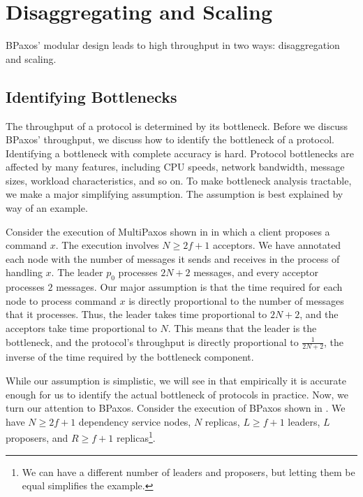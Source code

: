 \section{Disaggregating and Scaling}
BPaxos' modular design leads to high throughput in two ways: disaggregation and
scaling.

\subsection{Identifying Bottlenecks}
The throughput of a protocol is determined by its bottleneck. Before we discuss
BPaxos' throughput, we discuss how to identify the bottleneck of a protocol.
Identifying a bottleneck with complete accuracy is hard. Protocol bottlenecks
are affected by many features, including CPU speeds, network bandwidth, message
sizes, workload characteristics, and so on. To make bottleneck analysis
tractable, we make a major simplifying assumption. The assumption is best
explained by way of an example.

{}

Consider the execution of MultiPaxos shown in  in
which a client proposes a command $x$. The execution involves $N \geq 2f+1$
acceptors. We have annotated each node with the number of messages it sends and
receives in the process of handling $x$. The leader $p_0$ processes $2N+2$
messages, and every acceptor processes $2$ messages. Our major assumption is
that the time required for each node to process command $x$ is directly
proportional to the number of messages that it processes. Thus, the leader
takes time proportional to $2N+2$, and the acceptors take time proportional to
$N$. This means that the leader is the bottleneck, and the protocol's
throughput is directly proportional to $\frac{1}{2N+2}$, the inverse of the
time required by the bottleneck component.

While our assumption is simplistic, we will see in  that
empirically it is accurate enough for us to identify the actual bottleneck of
protocols in practice. Now, we turn our attention to BPaxos. Consider the
execution of BPaxos shown in . We have $N \geq 2f+1$
dependency service nodes, $N$ replicas, $L \geq f+1$ leaders, $L$ proposers,
and $R \geq f+1$ replicas\footnote{We can have a different number of leaders
and proposers, but letting them be equal simplifies the example.}.

{}


